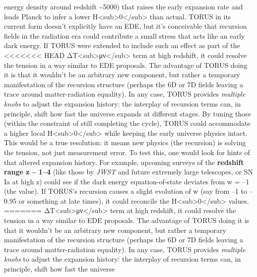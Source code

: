 \documentclass[]{article}
\begin{document}
\begin{enumerate}
  energy density around redshift \textasciitilde{}5000) that raises the
  early expansion rate and leads Planck to infer a lower
  H\textless{}sub\textgreater{}0\textless{}/sub\textgreater{} than
  actual. TORUS in its current form doesn't explicitly have an EDE, but
  it's conceivable that recursion fields in the radiation era could
  contribute a small stress that acts like an early dark energy. If
  TORUS were extended to include such an effect as part of the
<<<<<<< HEAD
  ΔT\textless sub\textgreater μν\textless/sub\textgreater{} term at high
  redshift, it could resolve the tension in a way similar to EDE
  proposals\hspace{0pt}. The advantage of TORUS doing it is that it
  wouldn't be an arbitrary new component, but rather a temporary
  manifestation of the recursion structure (perhaps the 6D or 7D fields
  leaving a trace around matter-radiation equality). In any case, TORUS
  provides \emph{multiple knobs} to adjust the expansion history: the
  interplay of recursion terms can, in principle, shift how fast the
  universe expands at different stages. By tuning those (within the
  constraint of still completing the cycle), TORUS could accommodate a
  higher local H\textless sub\textgreater0\textless/sub\textgreater{}
  while keeping the early universe physics intact\hspace{0pt}. This
  would be a true resolution: it means new physics (the recursion) is
  solving the tension, not just measurement error. To test this, one
  would look for hints of that altered expansion history. For example,
  upcoming surveys of the \textbf{redshift range z \textasciitilde{}
  1--4} (like those by \emph{JWST} and future extremely large
  telescopes, or SN Ia at high z) could see if the dark energy
  equation-of-state deviates from w = --1 (the  value). If TORUS's
  recursion causes a slight evolution of w (say from --1 to --0.95 or
  something at late times), it could reconcile the
  H\textless sub\textgreater0\textless/sub\textgreater{} values.
=======
  ΔT\textless{}sub\textgreater{}μν\textless{}/sub\textgreater{} term at
  high redshift, it could resolve the tension in a way similar to EDE
  proposals​. The advantage of TORUS doing it is that it wouldn't be an
  arbitrary new component, but rather a temporary manifestation of the
  recursion structure (perhaps the 6D or 7D fields leaving a trace
  around matter-radiation equality). In any case, TORUS provides
  \emph{multiple knobs} to adjust the expansion history: the interplay
  of recursion terms can, in principle, shift how fast the universe

\end{enumerate}
\end{document}
